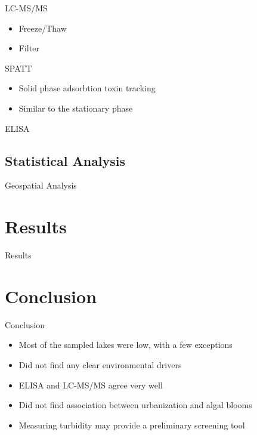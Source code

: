 \begin{frame}{LC-MS/MS}
	\begin{itemize}
		\item Freeze/Thaw
		\item Filter
	\end{itemize}

\end{frame}

\begin{frame}{SPATT}

	\begin{itemize}
		\item Solid phase adsorbtion toxin tracking
		\item Similar to the stationary phase
	\end{itemize}

\end{frame}
\begin{frame}{ELISA}

\end{frame}

\subsection{Statistical Analysis}
\begin{frame}{Geospatial Analysis}

\end{frame}
\section{Results}
\begin{frame}{Results}

\end{frame}
\section{Conclusion}
\begin{frame}{Conclusion}
	\begin{itemize}
		\item Most of the sampled lakes were low, with a few exceptions 
		\item Did not find any clear environmental drivers 
		\item ELISA and LC-MS/MS agree very well 
		\item Did not find association between urbanization and algal blooms 
		\item Measuring turbidity may provide a preliminary screening tool
	\end{itemize}

	
\end{frame}

